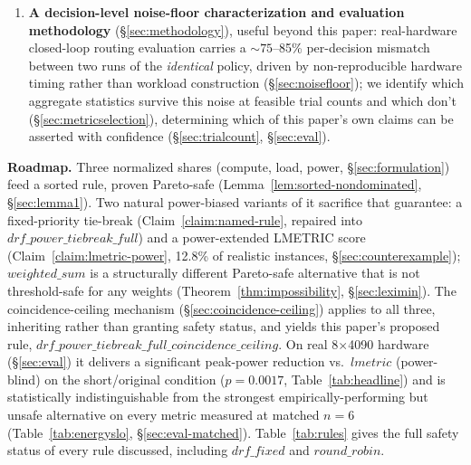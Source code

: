 \documentclass[sigconf,review,anonymous]{acmart}
\begin{document}
\begin{enumerate}
    distinguishable difference on any metric measured: peak power, TTFT, TBT,
    ramp-derivative statistics, energy-per-token, or SLO-violation-rate
    (\S\ref{sec:eval-dominance}--\S\ref{sec:eval-matched}). The guarantee is free on every
    axis tested.
  \item \textbf{A decision-level noise-floor characterization and evaluation methodology}
    (\S\ref{sec:methodology}), useful beyond this paper: real-hardware closed-loop routing
    evaluation carries a ${\sim}75$--85\% per-decision mismatch between two runs of the
    \emph{identical} policy, driven by non-reproducible hardware timing rather than workload
    construction (\S\ref{sec:noisefloor}); we identify which aggregate statistics survive this
    noise at feasible trial counts and which don't (\S\ref{sec:metricselection}), determining
    which of this paper's own claims can be asserted with confidence
    (\S\ref{sec:trialcount}, \S\ref{sec:eval}).
\end{enumerate}

\textbf{Roadmap.} Three normalized shares (compute, load, power, \S\ref{sec:formulation}) feed
a sorted rule, proven Pareto-safe (Lemma~\ref{lem:sorted-nondominated}, \S\ref{sec:lemma1}).
Two natural power-biased variants of it sacrifice that guarantee: a fixed-priority tie-break
(Claim~\ref{claim:named-rule}, repaired into $\mathit{drf\_power\_tiebreak\_full}$) and a
power-extended LMETRIC score (Claim~\ref{claim:lmetric-power}, 12.8\% of realistic instances,
\S\ref{sec:counterexample}); $\mathit{weighted\_sum}$ is a structurally different Pareto-safe
alternative that is not threshold-safe for any weights
(Theorem~\ref{thm:impossibility}, \S\ref{sec:leximin}). The coincidence-ceiling mechanism
(\S\ref{sec:coincidence-ceiling}) applies to all three, inheriting rather than granting safety
status, and yields this paper's proposed rule,
$\mathit{drf\_power\_tiebreak\_full\_coincidence\_ceiling}$. On real 8$\times$4090 hardware
(\S\ref{sec:eval}) it delivers a significant peak-power reduction vs.\ $\mathit{lmetric}$
(power-blind) on the short/original condition ($p{=}0.0017$, Table~\ref{tab:headline}) and is
statistically indistinguishable from the strongest empirically-performing but unsafe
alternative on every metric measured at matched $n{=}6$
(Table~\ref{tab:energyslo}, \S\ref{sec:eval-matched}).
Table~\ref{tab:rules} gives the full safety status of every rule discussed, including
$\mathit{drf\_fixed}$ and $\mathit{round\_robin}$.

\vspace{-3pt}
\end{document}
